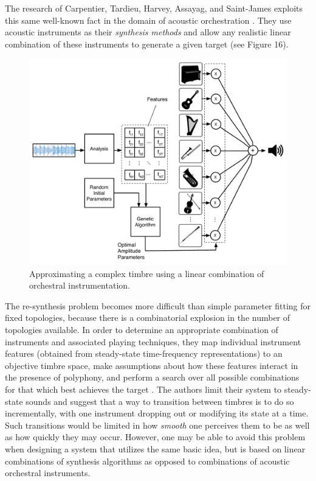 \documentclass[12pt]{report} 	%
\numberwithin{figure}{chapter}
\numberwithin{table}{chapter}
\numberwithin{equation}{chapter}
\begin{document}
\begin{flushleft}
The research of Carpentier, Tardieu, Harvey, Assayag, and Saint-James exploits this same well-known fact in the domain of acoustic orchestration \cite{Carpentier:2010fh}. They use acoustic instruments as their \textit{synthesis methods} and allow any realistic linear combination of these instruments to generate a given target (see Figure 16). 
\begin{figure}[h!]
\begin{center}
\includegraphics[scale=0.55]{OrchestralMetaSynthesis}
\caption[Searching for linear combinations of orchestral instruments]{Approximating a complex timbre using a linear combination of orchestral instrumentation.}
\end{center}
\end{figure}
The re-synthesis problem becomes more difficult than simple parameter fitting for fixed topologies, because there is a combinatorial explosion in the number of topologies available. In order to determine an appropriate combination of instruments and associated playing techniques, they map individual instrument features (obtained from steady-state time-frequency representations) to an objective timbre space, make assumptions about how these features interact in the presence of polyphony, and perform a search over all possible combinations for that which best achieves the target \cite[p. 2]{Carpentier:2010fh}. The authors limit their system to steady-state sounds and suggest that a way to transition between timbres is to do so incrementally, with one instrument dropping out or modifying its state at a time. Such transitions would be limited in how \textit{smooth} one perceives them to be as well as how quickly they may occur. However, one may be able to avoid this problem when designing a system that utilizes the same basic idea, but is based on linear combinations of synthesis algorithms as opposed to combinations of acoustic orchestral instruments.


\end{flushleft}
\end{document}
